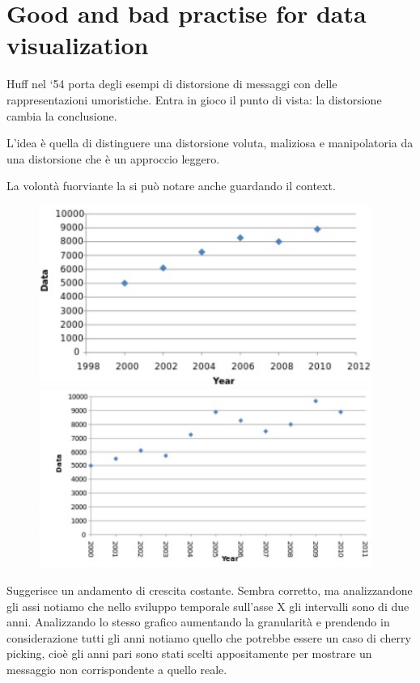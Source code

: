 \documentclass[12pt,a4paper]{report}
\begin{document}
\newpage
\section{Good and bad practise for data visualization}

Huff nel ‘54 porta degli esempi di distorsione di messaggi con delle rappresentazioni umoristiche. Entra in gioco il punto di vista: la distorsione cambia la conclusione. 

L'idea è quella di distinguere una distorsione voluta, maliziosa e manipolatoria da una distorsione che è un approccio leggero. 

La volontà fuorviante la si può notare anche guardando il context. 

\begin{figure}[h]
	\centering
	\includegraphics[width=.48\textwidth]{imgs datavis/puntini 1 .png}\hfil
	\includegraphics[width=.49\textwidth]{imgs datavis/puntini 2.png}
	
	\caption{}\label{}
\end{figure}

Suggerisce un andamento di crescita costante. Sembra corretto, ma analizzandone gli assi notiamo che nello sviluppo temporale sull'asse X gli intervalli sono di due anni. Analizzando lo stesso grafico aumentando la granularità e prendendo in considerazione tutti gli anni notiamo quello che potrebbe essere un caso di cherry picking, cioè gli anni pari sono stati scelti appositamente per mostrare un messaggio non corrispondente a quello reale.
\end{document}
